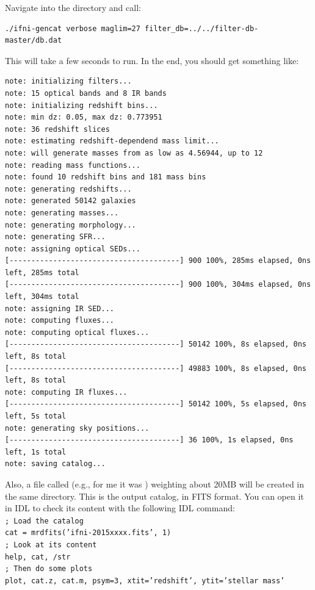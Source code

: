 \documentclass[12pt,a4paper]{article}
\begin{document}
Navigate into the  directory and call:
\begin{verbatim}
./ifni-gencat verbose maglim=27 filter_db=../../filter-db-master/db.dat
\end{verbatim}

This will take a few seconds to run. In the end, you should get something like:
\begin{verbatim}
note: initializing filters...
note: 15 optical bands and 8 IR bands
note: initializing redshift bins...
note: min dz: 0.05, max dz: 0.773951
note: 36 redshift slices
note: estimating redshift-dependend mass limit...
note: will generate masses from as low as 4.56944, up to 12
note: reading mass functions...
note: found 10 redshift bins and 181 mass bins
note: generating redshifts...
note: generated 50142 galaxies
note: generating masses...
note: generating morphology...
note: generating SFR...
note: assigning optical SEDs...
[---------------------------------------] 900 100%, 285ms elapsed, 0ns left, 285ms total
[---------------------------------------] 900 100%, 304ms elapsed, 0ns left, 304ms total
note: assigning IR SED...
note: computing fluxes...
note: computing optical fluxes...
[---------------------------------------] 50142 100%, 8s elapsed, 0ns left, 8s total
[---------------------------------------] 49883 100%, 8s elapsed, 0ns left, 8s total
note: computing IR fluxes...
[---------------------------------------] 50142 100%, 5s elapsed, 0ns left, 5s total
note: generating sky positions...
[---------------------------------------] 36 100%, 1s elapsed, 0ns left, 1s total
note: saving catalog...
\end{verbatim}

Also, a file called  (e.g., for me it was ) weighting about 20MB will be created in the same directory. This is the output catalog, in FITS format. You can open it in IDL to check its content with the following IDL command: \\[0.5cm]
\noindent \texttt{\color{gray}; Load the catalog} \\
\noindent \texttt{cat = mrdfits({\color{DodgerBlue}'ifni-2015xxxx.fits'}, {\color{red}1})} \\
\noindent \texttt{\color{gray}; Look at its content} \\
\noindent \texttt{{\color{Green}help}, cat, /str} \\
\noindent \texttt{\color{gray}; Then do some plots} \\
\noindent \texttt{{\color{Green}plot}, cat.z, cat.m, psym={\color{red}3}, xtit={\color{DodgerBlue}'redshift'}, ytit={\color{DodgerBlue}'stellar mass'}} \\
\end{document}
